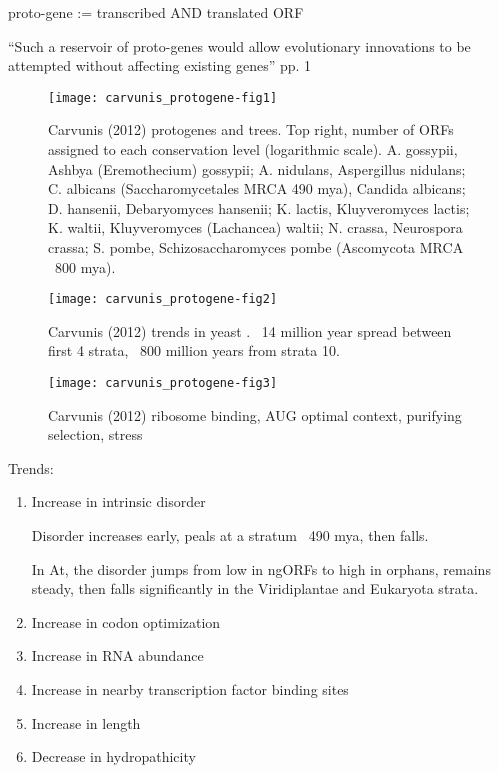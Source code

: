     proto-gene := transcribed AND translated ORF
    
    ``Such a reservoir of proto-genes would allow evolutionary innovations
    to be attempted without affecting existing genes'' pp. 1

    \begin{figure}[h!] \centering
        \texttt{[image: carvunis\_protogene-fig1]} \caption{
            Carvunis (2012) protogenes and trees. Top right, number of ORFs
            assigned to each conservation level (logarithmic scale). A.
            gossypii, Ashbya (Eremothecium) gossypii; A. nidulans,
            Aspergillus nidulans; C. albicans (Saccharomycetales MRCA 490
            mya), Candida albicans; D. hansenii, Debaryomyces hansenii; K.
            lactis, Kluyveromyces lactis; K. waltii, Kluyveromyces
        (Lachancea) waltii; N. crassa, Neurospora crassa; S. pombe,
    Schizosaccharomyces pombe (Ascomycota MRCA ~800 mya).  } \end{figure}
    \begin{figure}[h!] \centering
        \texttt{[image: carvunis\_protogene-fig2]} \caption{
            Carvunis (2012) trends in yeast
            \cite{carvunis_proto-genes_2012}.  ~14 million year spread
            between first 4 strata, ~800 million years from strata 10.  }
        \end{figure}
    \begin{figure}[h!] \centering
        \texttt{[image: carvunis\_protogene-fig3]} \caption{
        Carvunis (2012) ribosome binding, AUG optimal context, purifying
    selection, stress } \end{figure}
    \FloatBarrier

    Trends:

    \begin{enumerate}
        
        \item Increase in intrinsic disorder

        Disorder increases early, peals at a stratum ~490 mya, then falls.

        In At, the disorder jumps from low in ngORFs to high in orphans,
        remains steady, then falls significantly in the Viridiplantae and
        Eukaryota strata.

        \item Increase in codon optimization \item Increase in RNA abundance
    \item Increase in nearby transcription factor binding sites \item
    Increase in length \item Decrease in hydropathicity \end{enumerate}

